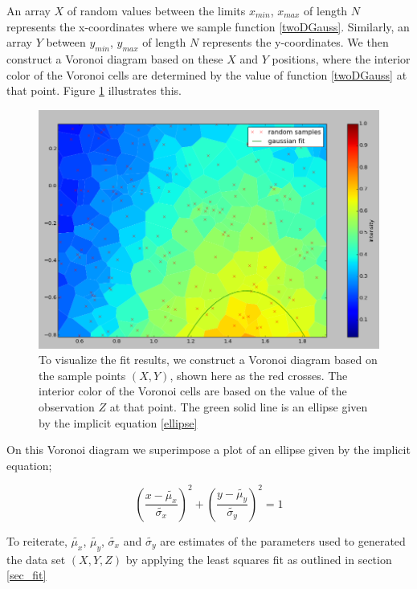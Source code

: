 \documentclass{article}
\begin{document}
An array $X$ of random values between the limits $x_{min}$, $x_{max}$ of length $N$ represents the x-coordinates where we sample function \ref{twoDGauss}. Similarly, an array $Y$ between $y_{min}$, $y_{max}$ of length $N$ represents the y-coordinates. We then construct a Voronoi diagram based on these $X$ and $Y$ positions, where the interior color of the Voronoi cells are determined by the value of function \ref{twoDGauss} at that point. Figure \ref{fig_fit_part} illustrates this. 

\begin{figure}
\includegraphics[width=1.0\textwidth]{randomSamples.png}
\caption{To visualize the fit results, we construct a Voronoi diagram based on the sample points $(X,Y)$, shown here as the red crosses. The interior color of the Voronoi cells are based on the value of the observation $Z$ at that point. The green solid line is an ellipse given by the implicit equation \ref{ellipse} }
\label{fig_fit_part}
\end{figure}

On this Voronoi diagram we superimpose a plot of an ellipse given by the implicit equation;

\begin{equation}
\left(\frac{x-\tilde{\mu_x}}{\tilde{\sigma_x}}\right)^2+\left(\frac{y-\tilde{\mu_y}}{\tilde{\sigma_y}}\right)^2=1
\label{ellipse}
\end{equation}

To reiterate, $\tilde{\mu_x}$, $\tilde{\mu_y}$, $\tilde{\sigma_x}$ and $\tilde{\sigma_y}$ are estimates of the parameters used to generated the data set $(X,Y,Z)$ by applying the least squares fit as outlined in section \ref{sec_fit}
\end{document}
